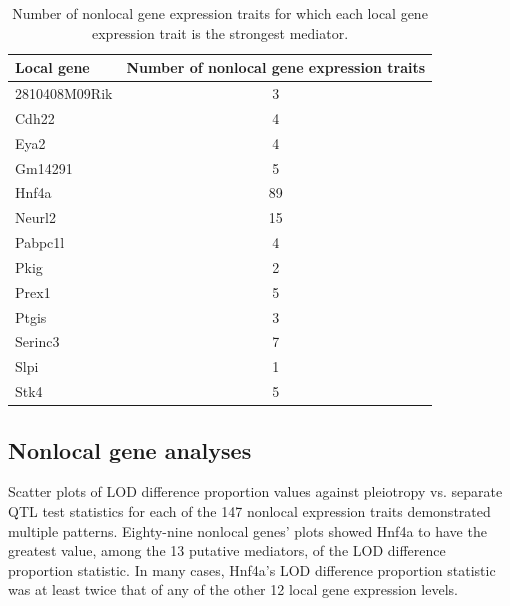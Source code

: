 \documentclass{article}
\begin{document}
\begin{table}[ht]
\centering
\begin{tabular}{lc}
  \hline
 Local gene & Number of nonlocal gene expression traits \\ 
  \hline
2810408M09Rik &   3 \\ 
  Cdh22 &   4 \\ 
  Eya2 &   4 \\ 
  Gm14291 &   5 \\ 
  Hnf4a &  89 \\ 
  Neurl2 &  15 \\ 
  Pabpc1l &   4 \\ 
  Pkig &   2 \\ 
  Prex1 &   5 \\ 
  Ptgis &   3 \\ 
  Serinc3 &   7 \\ 
  Slpi &   1 \\ 
  Stk4 &   5 \\ 
   \hline
\end{tabular}
\caption{Number of nonlocal gene expression traits for which each local gene expression trait is the strongest mediator.}
\label{tab:med-count}
\end{table}

\subsection{Nonlocal gene analyses}

Scatter plots of LOD difference proportion values against pleiotropy vs. separate QTL test statistics for each of the 147 nonlocal expression traits demonstrated multiple patterns. Eighty-nine nonlocal genes' plots showed Hnf4a to have the greatest value, among the 13 putative mediators, of the LOD difference proportion statistic. In many cases, Hnf4a's LOD difference proportion statistic was at least twice that of any of the other 12 local gene expression levels.
\end{document}
